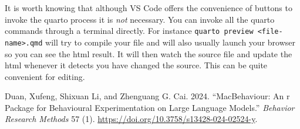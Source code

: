 \documentclass[
  letterpaper,
  DIV=11,
  numbers=noendperiod]{scrreprt}
\newlength{\cslhangindent}
\newenvironment{CSLReferences}[2] %
 {\begin{list}{}{%
  \setlength{\itemindent}{0pt}
  \setlength{\leftmargin}{0pt}
  \setlength{\parsep}{0pt}
  \ifodd #1
   \setlength{\leftmargin}{\cslhangindent}
   \setlength{\itemindent}{-1\cslhangindent}
  \fi
  \setlength{\itemsep}{#2\baselineskip}}}
 {\end{list}}
\begin{document}
It is worth knowing that although VS Code offers the convenience of
buttons to invoke the quarto process it is \emph{not} necessary. You can
invoke all the quarto commands through a terminal directly. For instance
\texttt{quarto\ preview\ \textless{}file-name\textgreater{}.qmd} will
try to compile your file and will also usually launch your browser so
you can see the html result. It will then watch the source file and
update the html whenever it detects you have changed the source. This
can be quite convenient for editing.

\label{refs}
\begin{CSLReferences}{1}{0}
Duan, Xufeng, Shixuan Li, and Zhenguang G. Cai. 2024. {``MacBehaviour:
An r Package for Behavioural Experimentation on Large Language
Models.''} \emph{Behavior Research Methods} 57 (1).
\url{https://doi.org/10.3758/s13428-024-02524-y}.

\end{CSLReferences}
\end{document}
